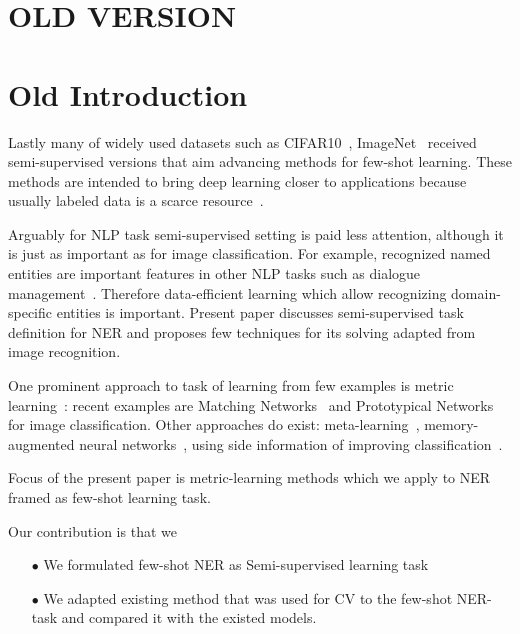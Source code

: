 \section*{OLD VERSION}

\section*{Old Introduction}



Lastly many of widely used datasets such as CIFAR10~\cite{cifar10}, ImageNet~\cite{imagenet} received semi-supervised versions that aim advancing methods for few-shot learning. These methods are intended to bring deep learning closer to applications because usually labeled data is a scarce resource~\cite{review_nlp}. 

Arguably for NLP task semi-supervised setting is paid less attention, although it is just as important as for image classification. For example, recognized named entities are important features in other NLP tasks such as dialogue management~\cite{dialogues_ner}. Therefore data-efficient learning which allow recognizing domain-specific entities is important. Present paper discusses semi-supervised task definition for NER and proposes few techniques for its solving adapted from image recognition.

One prominent approach to task of learning from few examples is metric learning~\cite{metric-learning}: recent examples are Matching Networks~\cite{matching} and Prototypical Networks~\cite{prototypical} for image classification. Other approaches do exist: meta-learning~\cite{few_shot_meta}, memory-augmented neural networks~\cite{few_shot_memory}, using side information of improving classification~\cite{fusing}.

Focus of the present paper is metric-learning methods which we apply to NER framed as few-shot learning task. 

Our contribution is that we
\begin{enumerate}
	\item[$\bullet$] We formulated few-shot NER as Semi-supervised learning task
	\item[$\bullet$] We adapted existing method that was used for CV to the few-shot NER-task and compared it with the existed models.
\end{enumerate}


